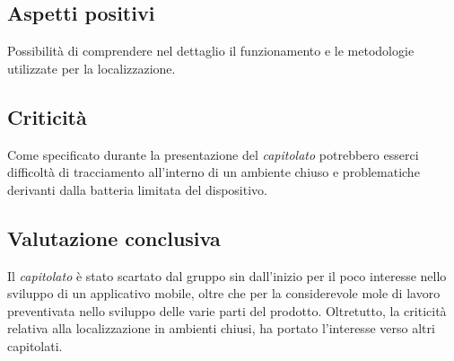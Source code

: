 \subsection{Aspetti positivi}
Possibilità di comprendere nel dettaglio il funzionamento e le metodologie utilizzate per la localizzazione.

\subsection{Criticità}
Come specificato durante la presentazione del \textit{capitolato\glo} potrebbero esserci difficoltà di tracciamento all'interno di un ambiente chiuso e problematiche derivanti dalla batteria limitata del dispositivo.

\subsection{Valutazione conclusiva}
Il \textit{capitolato\glo} è stato scartato dal gruppo sin dall'inizio per il poco interesse nello sviluppo di un applicativo mobile, oltre che per la considerevole mole di lavoro preventivata nello sviluppo delle varie parti del prodotto. Oltretutto, la criticità relativa alla localizzazione in ambienti chiusi, ha portato l'interesse verso altri capitolati.
